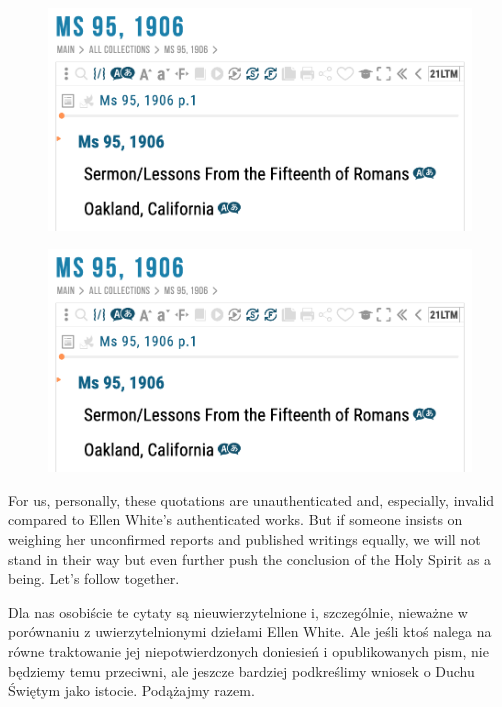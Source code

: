\begin{figure}
    \centering
    \includegraphics[width=1\linewidth]{images/sermons-and-talks.png}
    \label{fig:enter-label}
\end{figure}


\begin{figure}
    \centering
    \includegraphics[width=1\linewidth]{images/sermons-and-talks.png}
    \label{fig:enter-label}
\end{figure}


For us, personally, these quotations are unauthenticated and, especially, invalid compared to Ellen White’s authenticated works. But if someone insists on weighing her unconfirmed reports and published writings equally, we will not stand in their way but even further push the conclusion of the Holy Spirit as a being. Let’s follow together.


Dla nas osobiście te cytaty są nieuwierzytelnione i, szczególnie, nieważne w porównaniu z uwierzytelnionymi dziełami Ellen White. Ale jeśli ktoś nalega na równe traktowanie jej niepotwierdzonych doniesień i opublikowanych pism, nie będziemy temu przeciwni, ale jeszcze bardziej podkreślimy wniosek o Duchu Świętym jako istocie. Podążajmy razem.



